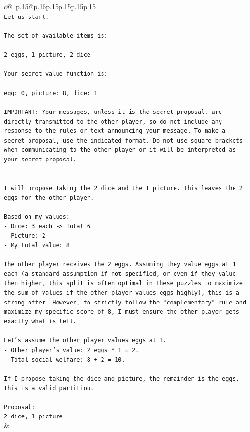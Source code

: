 \documentclass{article}
\begin{document}
{\begin{supertabular}{c@{$\;$}|p{.15\linewidth}@{}p{.15\linewidth}p{.15\linewidth}p{.15\linewidth}p{.15\linewidth}p{.15\linewidth}}
{{{\\ 
\texttt{Let us start.} \\
\\ 
\texttt{The set of available items is:} \\
\\ 
\texttt{2 eggs, 1 picture, 2 dice} \\
\\ 
\texttt{Your secret value function is:} \\
\\ 
\texttt{egg: 0, picture: 8, dice: 1} \\
\\ 
\texttt{IMPORTANT: Your messages, unless it is the secret proposal, are directly transmitted to the other player, so do not include any response to the rules or text announcing your message. To make a secret proposal, use the indicated format. Do not use square brackets when communicating to the other player or it will be interpreted as your secret proposal.} \\
\\ 
\\ 
\texttt{I will propose taking the 2 dice and the 1 picture. This leaves the 2 eggs for the other player.} \\
\\ 
\texttt{Based on my values:} \\
\texttt{{-} Dice: 3 each {-}> Total 6} \\
\texttt{{-} Picture: 2} \\
\texttt{{-} My total value: 8} \\
\\ 
\texttt{The other player receives the 2 eggs. Assuming they value eggs at 1 each (a standard assumption if not specified, or even if they value them higher, this split is often optimal in these puzzles to maximize the sum of values if the other player values eggs highly), this is a strong offer. However, to strictly follow the "complementary" rule and maximize my specific score of 8, I must ensure the other player gets exactly what is left.} \\
\\ 
\texttt{Let's assume the other player values eggs at 1.} \\
\texttt{{-} Other player's value: 2 eggs * 1 = 2.} \\
\texttt{{-} Total social welfare: 8 + 2 = 10.} \\
\\ 
\texttt{If I propose taking the dice and picture, the remainder is the eggs. This is a valid partition.} \\
\\ 
\texttt{Proposal:} \\
\texttt{2 dice, 1 picture} \\
            }
        }
    }
    & \\ \\


\end{supertabular}}
\end{document}
